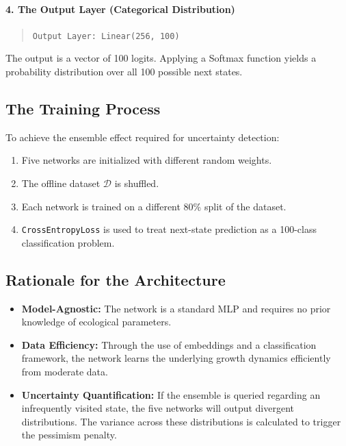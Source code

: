 \documentclass[11pt]{article}
\begin{document}
\paragraph{4. The Output Layer (Categorical Distribution)}
\begin{quote}
    \texttt{Output Layer: Linear(256, 100)}
\end{quote}
The output is a vector of 100 logits. Applying a Softmax function yields a probability distribution over all 100 possible next states.

\subsection*{The Training Process}
To achieve the ensemble effect required for uncertainty detection:
\begin{enumerate}
    \item Five networks are initialized with different random weights.
    \item The offline dataset $\mathcal{D}$ is shuffled.
    \item Each network is trained on a different 80\% split of the dataset.
    \item \texttt{CrossEntropyLoss} is used to treat next-state prediction as a 100-class classification problem.
\end{enumerate}

\subsection*{Rationale for the Architecture}
\begin{itemize}
    \item \textbf{Model-Agnostic:} The network is a standard MLP and requires no prior knowledge of ecological parameters.
    \item \textbf{Data Efficiency:} Through the use of embeddings and a classification framework, the network learns the underlying growth dynamics efficiently from moderate data.
    \item \textbf{Uncertainty Quantification:} If the ensemble is queried regarding an infrequently visited state, the five networks will output divergent distributions. The variance across these distributions is calculated to trigger the pessimism penalty.
\end{itemize}
\end{document}
